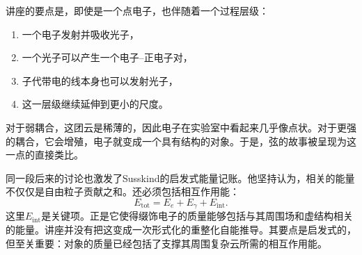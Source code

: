 讲座的要点是，即使是一个点电子，也伴随着一个过程层级：
\begin{enumerate}
\item 一个电子发射并吸收光子，
\item 一个光子可以产生一个电子--正电子对，
\item 子代带电的线本身也可以发射光子，
\item 这一层级继续延伸到更小的尺度。
\end{enumerate}
对于弱耦合，这团云是稀薄的，因此电子在实验室中看起来几乎像点状。对于更强的耦合，它会增殖，电子就变成一个具有结构的对象。于是，弦的故事被呈现为这一点的直接类比。

同一段后来的讨论也激发了Susskind的启发式能量记账。他坚持认为，相关的能量不仅仅是自由粒子贡献之和。还必须包括相互作用能：
\begin{equation}
E_{\mathrm{tot}} = E_e + E_\gamma + E_{\mathrm{int}}.
\end{equation}
这里\(E_{\mathrm{int}}\)是关键项。正是它使得缀饰电子的质量能够包括与其周围场和虚结构相关的能量。讲座并没有把这变成一次形式化的重整化自能推导。其要点是启发式的，但至关重要：对象的质量已经包括了支撑其周围复杂云所需的相互作用能。

\begin{classroomqa}
\end{classroomqa}

\begin{classroomqa}
\end{classroomqa}

\begin{classroomqa}
\end{classroomqa}

